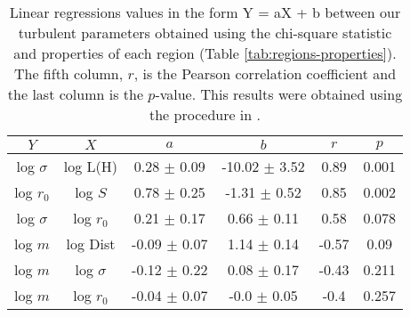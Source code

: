 \begin{table*}
\begin{center}
\caption{Linear regressions values in the form Y = aX + b between our turbulent parameters obtained using the chi-square statistic and properties of each region (Table \ref{tab:regions-properties}). The fifth column, $r$, is the Pearson correlation coefficient and the last column is the $p$-value. This results were obtained using the procedure in \citet{2007ApJ...665.1489K}.}
\begin{tabular}{cccccc}
\hline
            $Y$ &                   $X$ &                 $a$ &                 $b$ &       $r$ &      $p$ \\
\hline
 log $\sigma$ &            log L(H) &   0.28 $\pm$ 0.09 &  -10.02 $\pm$ 3.52 &   0.89 &  0.001 \\
    log $r_0$ &             log $S$ &   0.78 $\pm$ 0.25 &   -1.31 $\pm$ 0.52 &   0.85 &  0.002 \\
 log $\sigma$ &         log $r_{0}$ &   0.21 $\pm$ 0.17 &    0.66 $\pm$ 0.11 &   0.58 &  0.078 \\
      log $m$ &            log Dist &  -0.09 $\pm$ 0.07 &    1.14 $\pm$ 0.14 &  -0.57 &   0.09 \\
      log $m$ &        log $\sigma$ &  -0.12 $\pm$ 0.22 &    0.08 $\pm$ 0.17 &  -0.43 &  0.211 \\
      log $m$ &         log $r_{0}$ &  -0.04 $\pm$ 0.07 &    -0.0 $\pm$ 0.05 &   -0.4 &  0.257 \\
\bottomrule
\end{tabular}\label{tab:RestStats}
\end{center}
\end{table*}


